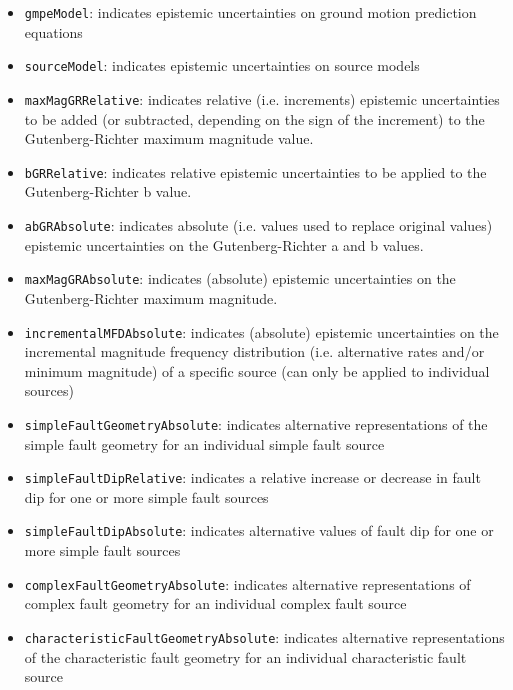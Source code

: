 \label{list_epistemic_unc}
\begin{itemize}

    \item \Verb+gmpeModel+: indicates epistemic uncertainties on ground
	motion prediction equations

	\item \Verb+sourceModel+: indicates epistemic uncertainties on source models

    \item \Verb+maxMagGRRelative+: indicates relative (i.e. increments)
	epistemic uncertainties to be added (or subtracted, depending on the sign
	of the increment) to the Gutenberg-Richter maximum magnitude value.

    \item \Verb+bGRRelative+: indicates relative epistemic uncertainties
	to be applied to the Gutenberg-Richter b value.

    \item \Verb+abGRAbsolute+: indicates absolute (i.e. values used to replace
	original values) epistemic uncertainties on the Gutenberg-Richter a and b
	values.

    \item \Verb+maxMagGRAbsolute+: indicates (absolute) epistemic
	uncertainties on the Gutenberg-Richter maximum magnitude.
	
	\item \Verb+incrementalMFDAbsolute+: indicates (absolute) epistemic uncertainties on the incremental magnitude frequency distribution (i.e. alternative rates and/or minimum magnitude) of a specific source (can only be applied to individual sources)
	
	\item \Verb+simpleFaultGeometryAbsolute+: indicates alternative representations of the simple fault geometry for an individual simple fault source
	
	\item \Verb+simpleFaultDipRelative+: indicates a relative increase or decrease in fault dip for one or more simple fault sources
	
	\item \Verb+simpleFaultDipAbsolute+: indicates alternative values of fault dip for one or more simple fault sources
	
	\item \Verb+complexFaultGeometryAbsolute+: indicates alternative representations of complex fault geometry for an individual complex fault source

	\item \Verb+characteristicFaultGeometryAbsolute+: indicates alternative representations of the characteristic fault geometry for an individual characteristic fault source

\end{itemize}

